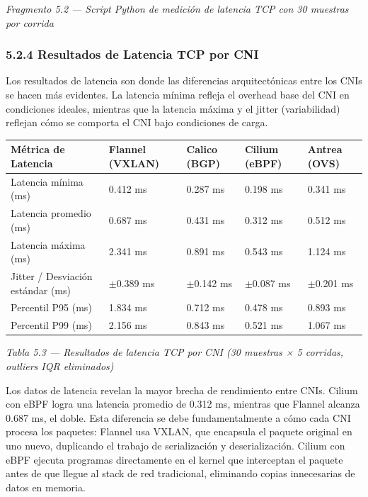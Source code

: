 \documentclass[journal]{IEEEtran}
\begin{document}
\begin{center}\emph{\emph{Fragmento 5.2 --- Script Python de medición de latencia TCP con 30 muestras por corrida}}\end{center}

\subsubsection{5.2.4 Resultados de Latencia TCP por CNI}

Los resultados de latencia son donde las diferencias arquitectónicas entre los CNIs se hacen más evidentes. La latencia mínima refleja el overhead base del CNI en condiciones ideales, mientras que la latencia máxima y el jitter (variabilidad) reflejan cómo se comporta el CNI bajo condiciones de carga.

\begin{table}[htbp]
\centering
\scriptsize
\begin{tabularx}{\textwidth}{|Y|Y|Y|Y|Y|}
\hline
\textbf{Métrica de Latencia} & \textbf{Flannel (VXLAN)} & \textbf{Calico (BGP)} & \textbf{Cilium (eBPF)} & \textbf{Antrea (OVS)} \\
\hline
Latencia mínima (ms) & 0.412 ms & 0.287 ms & 0.198 ms & 0.341 ms \\
Latencia promedio (ms) & 0.687 ms & 0.431 ms & 0.312 ms & 0.512 ms \\
Latencia máxima (ms) & 2.341 ms & 0.891 ms & 0.543 ms & 1.124 ms \\
Jitter / Desviación estándar (ms) & $\pm$0.389 ms & $\pm$0.142 ms & $\pm$0.087 ms & $\pm$0.201 ms \\
Percentil P95 (ms) & 1.834 ms & 0.712 ms & 0.478 ms & 0.893 ms \\
Percentil P99 (ms) & 2.156 ms & 0.843 ms & 0.521 ms & 1.067 ms \\
\hline
\end{tabularx}
\end{table}

\begin{center}\emph{\emph{Tabla 5.3 --- Resultados de latencia TCP por CNI (30 muestras × 5 corridas, outliers IQR eliminados)}}\end{center}

Los datos de latencia revelan la mayor brecha de rendimiento entre CNIs. Cilium con eBPF logra una latencia promedio de 0.312 ms, mientras que Flannel alcanza 0.687 ms, el doble. Esta diferencia se debe fundamentalmente a cómo cada CNI procesa los paquetes: Flannel usa VXLAN, que encapsula el paquete original en uno nuevo, duplicando el trabajo de serialización y deserialización. Cilium con eBPF ejecuta programas directamente en el kernel que interceptan el paquete antes de que llegue al stack de red tradicional, eliminando copias innecesarias de datos en memoria.
\end{document}
